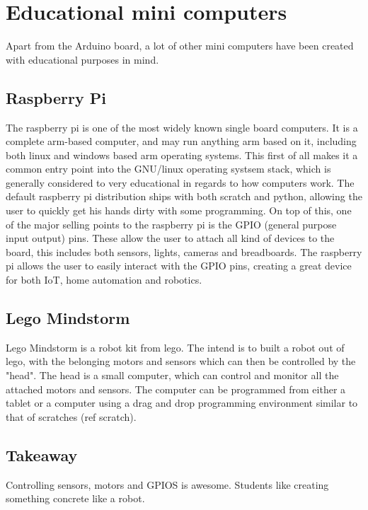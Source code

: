 \section{Educational mini computers}

Apart from the Arduino board, a lot of other mini computers have been created with educational purposes in mind.

\subsection{Raspberry Pi}
The raspberry pi is one of the most widely known single board computers. 
It is a complete arm-based computer, and may run anything arm based on it, including both linux and windows based arm operating systems. 
This first of all makes it a common entry point into the GNU/linux operating systsem stack, which is generally considered to very educational in regards to how computers work.
The default raspberry pi distribution ships with both scratch and python, allowing the user to quickly get his hands dirty with some programming.
On top of this, one of the major selling points to the raspberry pi is the GPIO (general purpose input output) pins. 
These allow the user to attach all kind of devices to the board, this includes both sensors, lights, cameras and breadboards. 
The raspberry pi allows the user to easily interact with the GPIO pins, creating a great device for both IoT, home automation and robotics.

\subsection{Lego Mindstorm}
Lego Mindstorm is a robot kit from lego. 
The intend is to built a robot out of lego, with the belonging motors and sensors which can then be controlled by the "head". 
The head is a small computer, which can control and monitor all the attached motors and sensors. 
The computer can be programmed from either a tablet or a computer using a drag and drop programming environment similar to that of scratches (ref scratch).

\subsection{Takeaway}

Controlling sensors, motors and GPIOS is awesome. Students like creating something concrete like a robot.